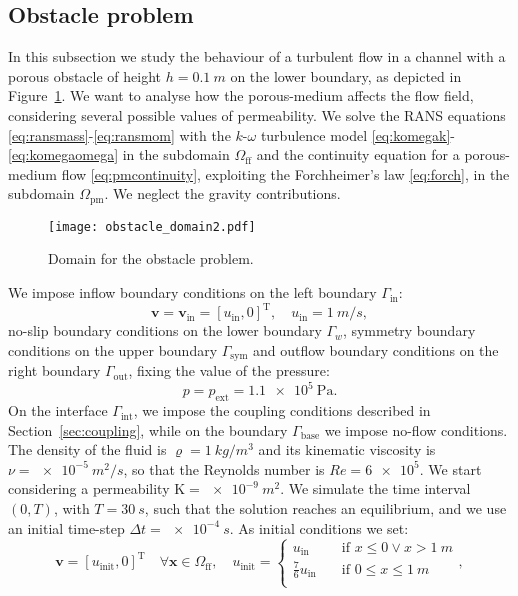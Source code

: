 \subsection{Obstacle problem}
In this subsection we study the behaviour of
a turbulent flow in a channel with a porous obstacle of height $h=\SI{0.1}{m}$ on the lower boundary, as depicted in Figure~\ref{fig:obstacle_domain}. We want to analyse how the porous-medium affects the flow field, considering several possible values of permeability.
We solve the RANS equations \eqref{eq:ransmass}-\eqref{eq:ransmom} with the $k\text{-}\omega$ turbulence model \eqref{eq:komegak}-\eqref{eq:komegaomega} in the subdomain $\Omega_\text{ff}$ and the continuity equation for a porous-medium flow \eqref{eq:pmcontinuity}, exploiting the Forchheimer's law \eqref{eq:forch}, in the subdomain $\Omega_\text{pm}$. We neglect the gravity contributions.
\begin{figure}
	\centering
	\texttt{[image: obstacle\_domain2.pdf]}
	\caption[Domain for the obstacle problem]{Domain for the obstacle problem.}
	\label{fig:obstacle_domain}
\end{figure}
We impose inflow boundary conditions on the left boundary $\Gamma_\text{in}$:
\begin{equation}
\mathbf{v} = \mathbf{v}_\text{in} = [u_\text{in}, 0]^\mathrm{T}, \quad u_\text{in} = \SI{1}{m/s},
\end{equation}
no-slip boundary conditions on the lower boundary $\Gamma_w$, symmetry boundary conditions on the upper boundary $\Gamma_\text{sym}$ and outflow boundary conditions on the right boundary $\Gamma_\text{out}$, fixing the value of the pressure:
\begin{equation}
	p = p_\text{ext} = \SI{1.1e5}{\pascal}.
\end{equation}
On the interface $\Gamma_\text{int}$, we impose the coupling conditions described in Section~\ref{sec:coupling}, while on the boundary $\Gamma_\text{base}$ we impose no-flow conditions.
The density of the fluid is $\varrho = \SI{1}{kg/m^3}$ and its kinematic viscosity is $\nu=\SI{e-5}{m^2/s}$, so that the Reynolds number is $Re=\num{6e5}$. We start considering a permeability $\mathrm{K}=\SI{e-9}{m^2}.$ We simulate the time interval $(0,T) $, with $T=\SI{30}{s}$, such that the solution reaches an equilibrium, and we use an initial time-step $\Delta t = \SI{e-4}{s}$. As initial conditions we set:
\begin{equation}
	\mathbf{v} = [u_\text{init}, 0]^\mathrm{T} \quad \forall \mathbf{x} \in \Omega_\text{ff}, \quad u_\text{init} =
	\begin{cases}
	u_\text{in} \quad&\text{if $x\leq 0 \lor x > \SI{1}{m}$}\\
	\frac{7}{6}u_\text{in} \quad&\text{if $0 \leq x \leq \SI{1}{m}$}\\
	\end{cases},
\end{equation}
